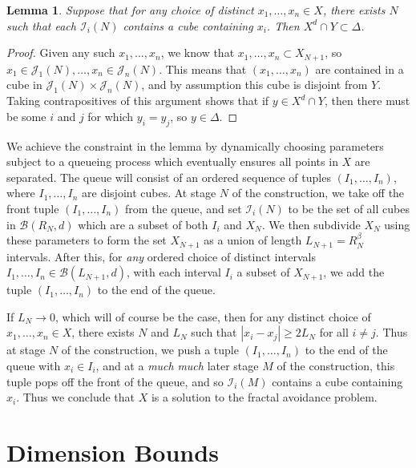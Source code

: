 \documentclass{article}
\theoremstyle{plain}
\newtheorem{lemma}{Lemma}
\theoremstyle{plain}
\begin{document}
\begin{multicols}{2}
\begin{lemma}
	Suppose that for any choice of distinct $x_1, \dots, x_n \in X$, there exists $N$ such that each $\mathcal{I}_i(N)$ contains a cube containing $x_i$. Then $X^d \cap Y \subset \Delta$.
\end{lemma}
\begin{proof}
	Given any such $x_1, \dots, x_n$, we know that $x_1, \dots, x_n \subset X_{N+1}$, so $x_1 \in \mathcal{J}_1(N), \dots, x_n \in \mathcal{J}_n(N)$. This means that $(x_1, \dots, x_n)$ are contained in a cube in $\mathcal{J}_1(N) \times \mathcal{J}_n(N)$, and by assumption this cube is disjoint from $Y$. Taking contrapositives of this argument shows that if $y \in X^d \cap Y$, then there must be some $i$ and $j$ for which $y_i = y_j$, so $y \in \Delta$.
\end{proof}


We achieve the constraint in the lemma by dynamically choosing parameters subject to a queueing process which eventually ensures all points in $X$ are separated. The queue will consist of an ordered sequence of tuples $(I_1, \dots, I_n)$, where $I_1 ,\dots, I_n$ are disjoint cubes. At stage $N$ of the construction, we take off the front tuple $(I_1, \dots, I_n)$ from the queue, and set $\mathcal{I}_i(N)$ to be the set of all cubes in $\mathcal{B}(R_N,d)$ which are a subset of both $I_i$ and $X_N$. We then subdivide $X_N$ using these parameters to form the set $X_{N+1}$ as a union of length $L_{N+1} = R_N^\beta$ intervals. After this, for {\it any} ordered choice of distinct intervals $I_1, \dots, I_n \in \mathcal{B}(L_{N+1},d)$, with each interval $I_i$ a subset of $X_{N+1}$, we add the tuple $(I_1, \dots, I_n)$ to the end of the queue.

If $L_N \to 0$, which will of course be the case, then for any distinct choice of $x_1, \dots, x_n \in X$, there exists $N$ and $L_N$ such that $|x_i - x_j| \geq 2 L_N$ for all $i \neq j$. Thus at stage $N$ of the construction, we push a tuple $(I_1, \dots, I_n)$ to the end of the queue with $x_i \in I_i$, and at a {\it much} {\it much} later stage $M$ of the construction, this tuple pops off the front of the queue, and so $\mathcal{I}_i(M)$ contains a cube containing $x_i$. Thus we conclude that $X$ is a solution to the fractal avoidance problem.

\section{Dimension Bounds}


\end{multicols}
\end{document}
